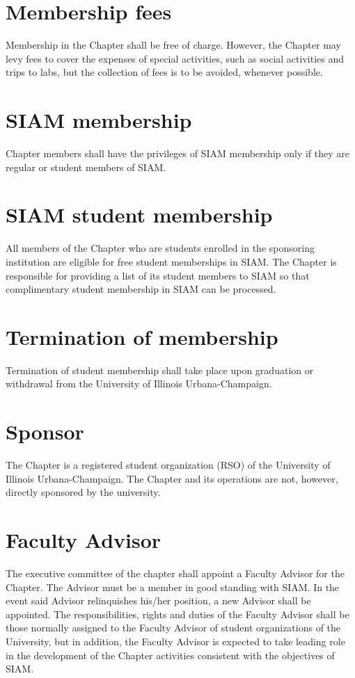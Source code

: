 \documentclass{ronr-bylaws}
\begin{document}
\section{Membership fees}
Membership in the Chapter shall be free of charge. However, the Chapter may levy
fees to cover the expenses of special activities, such as social activities and trips to labs, but the
collection of fees is to be avoided, whenever possible.

\section{SIAM membership}
Chapter members shall have the privileges of SIAM membership only if they are regular
or student members of SIAM.

\section{SIAM student membership}
All members of the Chapter who are students enrolled in the sponsoring institution are
eligible for free student memberships in SIAM. The Chapter is responsible for providing a list of its
student members to SIAM so that complimentary student membership in SIAM can be processed.

\section{Termination of membership}
Termination of student membership shall take place upon graduation or withdrawal
from the University of Illinois Urbana-Champaign.
%
\section{Sponsor}
The Chapter is a registered student organization (RSO) of the University of Illinois Urbana-Champaign.  The Chapter and its operations are not, however, directly sponsored by the university.

\section{Faculty Advisor}
The executive committee of the chapter shall appoint a Faculty Advisor for the Chapter.  The Advisor must be a member in good standing with SIAM. In the event said Advisor relinquishes his/her position, a new Advisor shall be appointed.  The responsibilities, rights and duties of the Faculty Advisor shall be those normally assigned to the Faculty Advisor of student organizations of the University, but in addition, the Faculty Advisor is expected to take leading role in the development of the Chapter activities consistent with the objectives of SIAM.
%
\label{article:officers}
\end{document}
